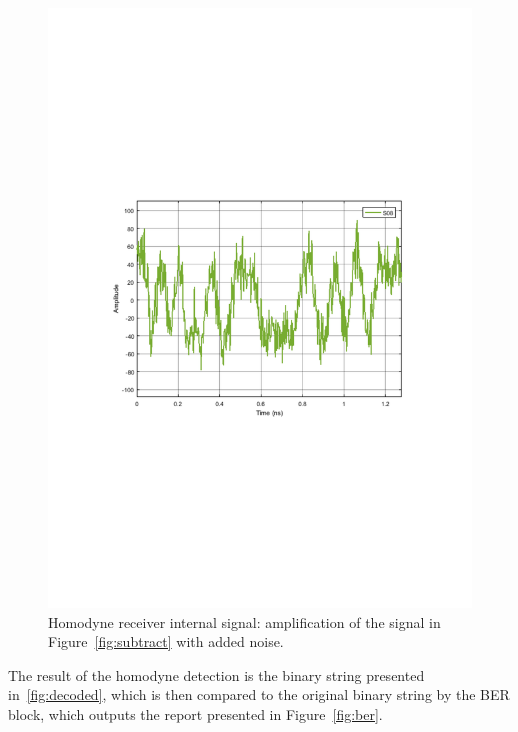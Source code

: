\documentclass[a4paper]{article}
\begin{document}
\begin{figure}[H]
\centering
\includegraphics[width=\linewidth, trim= 0mm 95mm 0mm 95mm, clip]{noisy.pdf}
\caption{Homodyne receiver internal signal: amplification of the signal in Figure~\ref{fig:subtract} with added noise.}
\label{fig:noisy}
\end{figure}

The result of the homodyne detection is the binary string presented in~\ref{fig:decoded}, which is then compared to the original binary string by the BER block, which outputs the report presented in Figure~\ref{fig:ber}.
\end{document}
